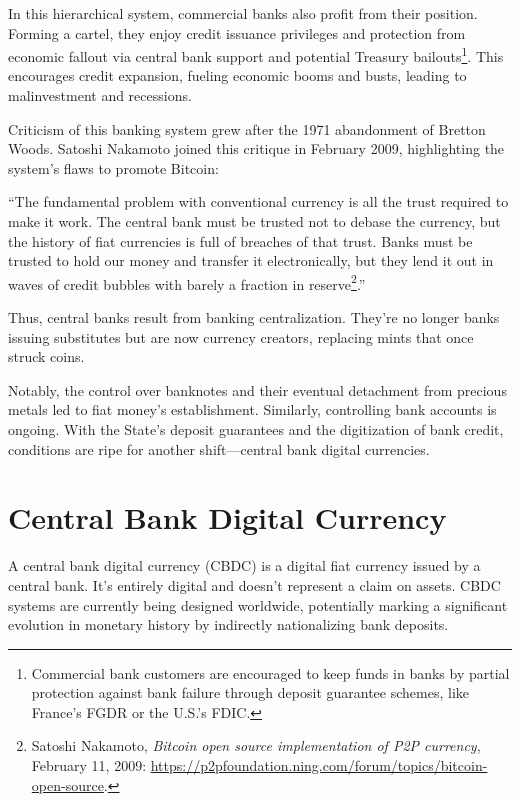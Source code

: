 \documentclass[
  a5paper,
  smalldemyvopaper,10pt,twoside,onecolumn,openright,extrafontsizes,hidelinks]{memoir}
\begin{document}
In this hierarchical system, commercial banks also profit from their
position. Forming a cartel, they enjoy credit issuance privileges and
protection from economic fallout via central bank support and potential
Treasury bailouts\footnote{Commercial bank customers are encouraged to
  keep funds in banks by partial protection against bank failure through
  deposit guarantee schemes, like France's FGDR or the U.S.'s FDIC.}.
This encourages credit expansion, fueling economic booms and busts,
leading to malinvestment and recessions.

Criticism of this banking system grew after the 1971 abandonment of
Bretton Woods. Satoshi Nakamoto joined this critique in February 2009,
highlighting the system's flaws to promote Bitcoin:

``The fundamental problem with conventional currency is all the trust
required to make it work. The central bank must be trusted not to debase
the currency, but the history of fiat currencies is full of breaches of
that trust. Banks must be trusted to hold our money and transfer it
electronically, but they lend it out in waves of credit bubbles with
barely a fraction in reserve\footnote{Satoshi Nakamoto, \emph{Bitcoin
  open source implementation of P2P currency}, February 11, 2009:
  \url{https://p2pfoundation.ning.com/forum/topics/bitcoin-open-source}.}.''

Thus, central banks result from banking centralization. They're no
longer banks issuing substitutes but are now currency creators,
replacing mints that once struck coins.

Notably, the control over banknotes and their eventual detachment from
precious metals led to fiat money's establishment. Similarly,
controlling bank accounts is ongoing. With the State's deposit
guarantees and the digitization of bank credit, conditions are ripe for
another shift---central bank digital currencies.

\section*{Central Bank Digital
Currency}\label{la-monnaie-numuxe9rique-de-banque-centrale}


A central bank digital currency (CBDC) is a digital fiat currency issued
by a central bank. It's entirely digital and doesn't represent a claim
on assets. CBDC systems are currently being designed worldwide,
potentially marking a significant evolution in monetary history by
indirectly nationalizing bank deposits.
\end{document}

